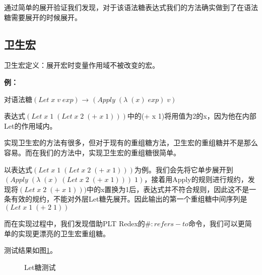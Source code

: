 通过简单的展开验证我们发现，对于该语法糖表达式我们的方法确实做到了在语法糖需要展开的时候展开。

\label{mark:hygienic}\subsection{卫生宏}

卫生宏定义：展开宏时变量作用域不被改变的宏。

{\bfseries 例：}

对语法糖$(Let\;x\;v\;exp)$ → $(Apply\;(\lambda\;(x)\;exp)\;v)$

表达式$(Let\;x\;1\;(Let\;x\;2\;(+\;x\;1)))$中的(+ x 1)将用值为2的x，因为他在内部Let的作用域内。

实现卫生宏的方法有很多，但对于现有的重组糖方法，卫生宏的重组糖\cite{hygienic}并不是那么容易。而在我们的方法中，实现卫生宏的重组糖很简单。

以表达式$(Let\;x\;1\;(Let\;x\;2\;(+\;x\;1)))$为例。我们会先将它单步展开到
$(Apply\;(\lambda\;(x)\;(Let\;x\;2\;(+\;x\;1)))\;1)$，接着用Apply的规则进行规约，发现将$(Let\;x\;2\;(+\;x\;1)))$中的x置换为1后，表达式并不符合规则，因此这不是一条有效的规约，不能对外层Let糖先展开。因此输出的第一个重组糖中间序列是$(Let\;x\;1\;(+\;2\;1))$

而在实现过程中，我们发现借助PLT Redex的$\#:refers-to$命令，我们可以更简单的实现更漂亮的卫生宏重组糖。

测试结果如图\ref{fig:let}。

\begin{figure}[ht]
	\begin{center}
	\end{center}
	\caption{Let糖测试}
	\label{fig:let}
\end{figure}



